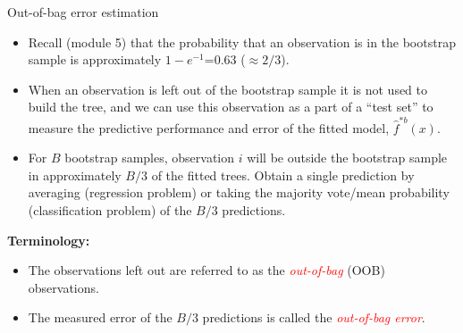 \documentclass[10pt,ignorenonframetext,]{beamer}
\begin{document}
\begin{frame}

\begin{block}{Out-of-bag error estimation}

\vspace{1mm}

\begin{itemize}
\item
  Recall (module 5) that the probability that an observation is in the
  bootstrap sample is approximately \(1-e^{-1}\)=0.63 (\(\approx 2/3\)).
\item
  When an observation is left out of the bootstrap sample it is not used
  to build the tree, and we can use this observation as a part of a
  ``test set'' to measure the predictive performance and error of the
  fitted model, \(\hat{f}^{*b}(x)\).
\item
  For \(B\) bootstrap samples, observation \(i\) will be outside the
  bootstrap sample in approximately \(B/3\) of the fitted trees. Obtain
  a single prediction by averaging (regression problem) or taking the
  majority vote/mean probability (classification problem) of the \(B/3\)
  predictions.
\end{itemize}

\vspace{2mm}

\textbf{Terminology:}

\begin{itemize}
\item
  The observations left out are referred to as the
  \emph{\textcolor{red}{out-of-bag}} (OOB) observations.
\item
  The measured error of the \(B/3\) predictions is called the
  \emph{\textcolor{red}{out-of-bag error}}.
\end{itemize}

\end{block}

\end{frame}
\end{document}

